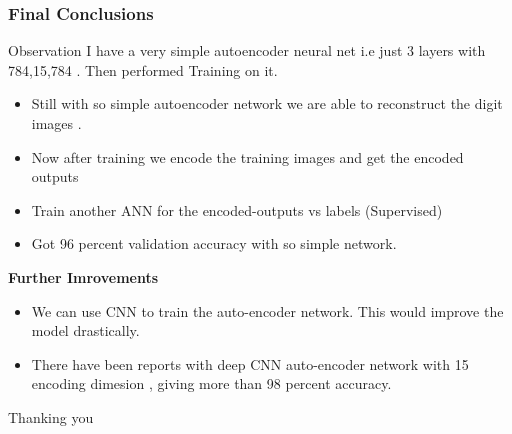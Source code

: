 \documentclass[12pt,t]{beamer}
\begin{document}
\begin{frame}
    \frametitle{Final Conclusions}
    \begin{block}{Observation}
        \scriptsize
        I have a very simple autoencoder neural net i.e just 3 layers with 784,15,784 . Then performed Training on it.
        \begin{itemize}
            \item  Still with so simple autoencoder network we are able to reconstruct the digit images . 
            \item  Now after training we encode the training images and get the encoded outputs
            \item Train another ANN for the encoded-outputs vs labels (Supervised)
            \item Got 96 percent validation accuracy with so simple network.

        \end{itemize}


    \end{block}
    \textbf{Further Imrovements}
    \begin{itemize}
        \item We can use CNN to train the auto-encoder network. This would improve the model drastically.
        \item There have been reports with deep CNN auto-encoder network with 15 encoding dimesion , giving 
            more than 98 percent accuracy.
    \end{itemize}

\end{frame}


\begin{frame}

    \large \centering Thanking you 

    

\end{frame}
\end{document}
